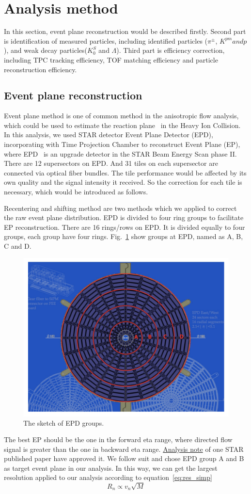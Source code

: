 
\section{Analysis method}
In this section, event plane reconstruction would be described firstly.
Second part is identification of measured particles, including identified particles ($\pi^{\pm}$, $K^{pm} and p$), 
and weak decay particles($K_0^S$ and $\Lambda$). Third part is efficiency correction, 
including TPC tracking efficiency, TOF matching efficiency and particle reconstruction efficiency.


\subsection{Event plane reconstruction}
Event plane method is one of common method in the anisotropic flow analysis, which could be used to estimate
the reaction plane~\cite{PhysRevC.83.044913} in the Heavy Ion Collision. In this analysis, we used STAR detector 
Event Plane Detector (EPD), incorporating with Time Projection Chamber to reconstruct Event Plane (EP), 
where EPD~\cite{ADAMS2020163970} is an upgrade detector in the STAR Beam Energy Scan phase II. There are 12 supersectors
on EPD. And 31 tiles on each supersector are connected via optical fiber bundles.
The tile performance would be affected by its own quality and the signal intensity it received.
So the correction for each tile is necessary, which would be introduced as follows.

Recentering and shifting method are two methods which we applied to correct the raw event plane
distribution. EPD is divided to four ring groups to facilitate EP reconstruction. There are 16 rings/rows
on EPD. It is divided equally to four groups, each group have four rings. 
Fig.~\ref{fig:EPDgroup} show groups at EPD, named as A, B, C and D.
\begin{figure}[hbt!]
\centering
\includegraphics[width=0.45\linewidth]{figures/chapter02/EPDgroup.png}
\caption{The sketch of EPD groups.}
\label{fig:EPDgroup}
\end{figure}
The best EP should be the one in the forward eta range, where directed flow
signal is greater than the one in backward eta range. \href{https://drupal.star.bnl.gov/STAR/system/files/FXT3gev_note_v4.pdf}{Analysis note} of one STAR published paper have approved it. 
We follow suit and chose EPD group A and B as target event plane in our analysis.
In this way, we can get the largest resolution applied to our analysis according to equation~\ref{eq:res_simp}
\begin{equation}
    R_n \propto v_n \sqrt{M}
\label{eq:res_simp}
\end{equation}

